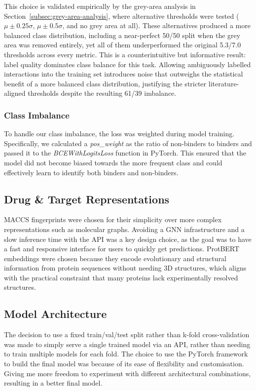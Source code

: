 This choice is validated empirically by the grey-area analysis in Section~\ref{subsec:grey-area-analysis}, where alternative thresholds were tested ($\mu \pm 0.25\sigma$, $\mu \pm 0.5\sigma$, and no grey area at all).
These alternatives produced a more balanced class distribution, including a near-perfect 50/50 split when the grey area was removed entirely, yet all of them underperformed the original 5.3/7.0 thresholds across every metric.
This is a counterintuitive but informative result: label quality dominates class balance for this task.
Allowing ambiguously labelled interactions into the training set introduces noise that outweighs the statistical benefit of a more balanced class distribution, justifying the stricter literature-aligned thresholds despite the resulting 61/39 imbalance.
\subsubsection{Class Imbalance}
To handle our class imbalance, the loss was weighted during model training.
Specifically, we calculated a \textit{pos\_weight} as the ratio of non-binders to binders and passed it to the \textit{BCEWithLogitsLoss} function in PyTorch.
This ensured that the model did not become biased towards the more frequent class and could effectively learn to identify both binders and non-binders.

\subsection{Drug \& Target Representations}
MACCS fingerprints were chosen for their simplicity over more complex representations such as molecular graphs.
Avoiding a GNN infrastructure and a slow inference time with the API was a key design choice, as the goal was to have a fast and responsive interface for users to quickly get predictions.
ProtBERT embeddings were chosen because they encode evolutionary and structural information from protein sequences without needing 3D structures, which aligns with the practical constraint that many proteins lack experimentally resolved structures.
\subsection{Model Architecture}
The decision to use a fixed train/val/test split rather than k-fold cross-validation was made to simply serve a single trained model via an API, rather than needing to train multiple models for each fold.
The choice to use the PyTorch framework to build the final model was because of its ease of flexibility and customisation.
Giving me more freedom to experiment with different architectural combinations, resulting in a better final model.
